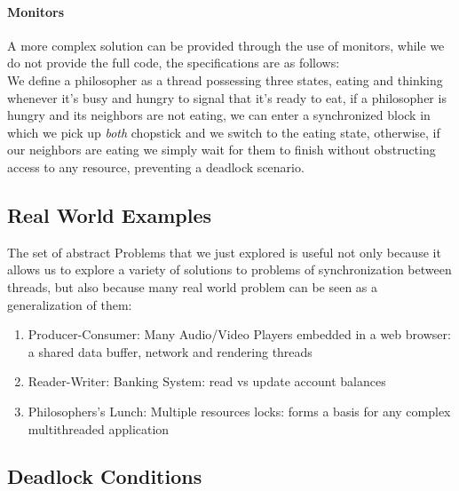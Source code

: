 \documentclass[openright, twoside]{report}
\theoremstyle{definition}
\theoremstyle{example}
\begin{document}
		\paragraph{Monitors}
		A more complex solution can be provided through the use of monitors, while we do not provide the full code, the specifications are as follows:\\

		We define a philosopher as a thread possessing three states, eating and thinking whenever it's busy and hungry to signal that it's ready 
		to eat, if a philosopher is hungry and its neighbors are not eating, we can enter a synchronized block in which we pick up 
		\emph{both} chopstick and we switch to the eating state, otherwise, if our neighbors are eating we simply wait for them to finish without
		obstructing access to any resource, preventing a deadlock scenario.

			\subsection{Real World Examples}
			The set of abstract Problems that we just explored is useful not only because it allows us to explore a variety of solutions to 
			problems of synchronization between threads, but also because many real world problem can be seen as a generalization of them:
			
			\begin{enumerate}
				\item Producer-Consumer: Many Audio/Video Players embedded in a 
				web browser: a shared data buffer, network and rendering threads
				\item Reader-Writer: Banking System: read vs update account balances
				\item Philosophers's Lunch: Multiple resources locks: forms a basis 
				for any complex multithreaded application
			\end{enumerate}
		
		\subsection{Deadlock Conditions}
\end{document}
